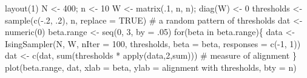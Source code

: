 \documentclass[
  a4paper,
  DIV=11,
  numbers=noendperiod,
  oneside]{scrreprt}
\newenvironment{Shaded}{}{}
\newcommand{\AttributeTok}[1]{\textcolor[rgb]{0.84,0.23,0.29}{#1}}
\newcommand{\CommentTok}[1]{\textcolor[rgb]{0.42,0.45,0.49}{#1}}
\newcommand{\ConstantTok}[1]{\textcolor[rgb]{0.00,0.36,0.77}{#1}}
\newcommand{\ControlFlowTok}[1]{\textcolor[rgb]{0.84,0.23,0.29}{#1}}
\newcommand{\DecValTok}[1]{\textcolor[rgb]{0.00,0.36,0.77}{#1}}
\newcommand{\FunctionTok}[1]{\textcolor[rgb]{0.44,0.26,0.76}{#1}}
\newcommand{\NormalTok}[1]{\textcolor[rgb]{0.14,0.16,0.18}{#1}}
\newcommand{\OtherTok}[1]{\textcolor[rgb]{0.44,0.26,0.76}{#1}}
\newcommand{\SpecialCharTok}[1]{\textcolor[rgb]{0.00,0.36,0.77}{#1}}
\newcommand{\StringTok}[1]{\textcolor[rgb]{0.01,0.18,0.38}{#1}}
\begin{document}
\begin{Shaded}
\begin{Highlighting}[]
\FunctionTok{layout}\NormalTok{(}\DecValTok{1}\NormalTok{)}
\NormalTok{N }\OtherTok{\textless{}{-}} \DecValTok{400}\NormalTok{; n }\OtherTok{\textless{}{-}} \DecValTok{10}
\NormalTok{W }\OtherTok{\textless{}{-}} \FunctionTok{matrix}\NormalTok{(.}\DecValTok{1}\NormalTok{, n, n); }\FunctionTok{diag}\NormalTok{(W) }\OtherTok{\textless{}{-}} \DecValTok{0}
\NormalTok{thresholds }\OtherTok{\textless{}{-}} \FunctionTok{sample}\NormalTok{(}\FunctionTok{c}\NormalTok{(}\SpecialCharTok{{-}}\NormalTok{.}\DecValTok{2}\NormalTok{, .}\DecValTok{2}\NormalTok{), n, }
            \AttributeTok{replace =} \ConstantTok{TRUE}\NormalTok{) }\CommentTok{\# a random pattern of thresholds}
\NormalTok{dat }\OtherTok{\textless{}{-}} \FunctionTok{numeric}\NormalTok{(}\DecValTok{0}\NormalTok{)}
\NormalTok{beta.range }\OtherTok{\textless{}{-}} \FunctionTok{seq}\NormalTok{(}\DecValTok{0}\NormalTok{, }\DecValTok{3}\NormalTok{, }\AttributeTok{by =}\NormalTok{ .}\DecValTok{05}\NormalTok{)}
\ControlFlowTok{for}\NormalTok{(beta }\ControlFlowTok{in}\NormalTok{ beta.range)\{}
\NormalTok{  data }\OtherTok{\textless{}{-}} \FunctionTok{IsingSampler}\NormalTok{(N, W, }\AttributeTok{nIter =} \DecValTok{100}\NormalTok{, thresholds, }
                       \AttributeTok{beta =}\NormalTok{ beta, }\AttributeTok{responses =} \FunctionTok{c}\NormalTok{(}\SpecialCharTok{{-}}\DecValTok{1}\NormalTok{, }\DecValTok{1}\NormalTok{))}
\NormalTok{  dat }\OtherTok{\textless{}{-}} \FunctionTok{c}\NormalTok{(dat, }\FunctionTok{sum}\NormalTok{(thresholds }\SpecialCharTok{*} \FunctionTok{apply}\NormalTok{(data,}\DecValTok{2}\NormalTok{,sum))) }\CommentTok{\# measure of alignment}
\NormalTok{\}}
\FunctionTok{plot}\NormalTok{(beta.range, dat, }\AttributeTok{xlab =} \StringTok{\textquotesingle{}beta\textquotesingle{}}\NormalTok{, }\AttributeTok{ylab =} \StringTok{\textquotesingle{}alignment with thresholds\textquotesingle{}}\NormalTok{, }
     \AttributeTok{bty =} \StringTok{\textquotesingle{}n\textquotesingle{}}\NormalTok{)}
\end{Highlighting}
\end{Shaded}
\end{document}
